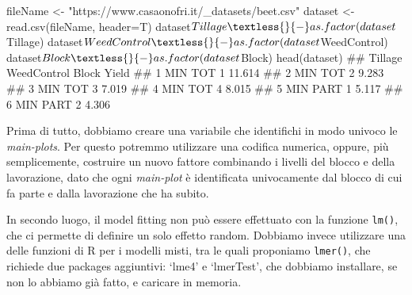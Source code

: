 \documentclass[a4paper,12pt,oneside]{book}
\newenvironment{Shaded}{\begin{snugshade}}{\end{snugshade}}
\newcommand{\SpecialCharTok}[1]{#1}
\newcommand{\StringTok}[1]{#1}
\newcommand{\DocumentationTok}[1]{#1}
\newcommand{\OtherTok}[1]{#1}
\newcommand{\FunctionTok}[1]{#1}
\newcommand{\AttributeTok}[1]{#1}
\newcommand{\NormalTok}[1]{#1}
\begin{document}
\begin{Shaded}
\begin{Highlighting}[]
\NormalTok{fileName }\OtherTok{\textless{}{-}} \StringTok{"https://www.casaonofri.it/\_datasets/beet.csv"}
\NormalTok{dataset }\OtherTok{\textless{}{-}} \FunctionTok{read.csv}\NormalTok{(fileName, }\AttributeTok{header=}\NormalTok{T)}
\NormalTok{dataset}\SpecialCharTok{$}\NormalTok{Tillage }\OtherTok{\textless{}{-}} \FunctionTok{as.factor}\NormalTok{(dataset}\SpecialCharTok{$}\NormalTok{Tillage)}
\NormalTok{dataset}\SpecialCharTok{$}\NormalTok{WeedControl }\OtherTok{\textless{}{-}} \FunctionTok{as.factor}\NormalTok{(dataset}\SpecialCharTok{$}\NormalTok{WeedControl)}
\NormalTok{dataset}\SpecialCharTok{$}\NormalTok{Block }\OtherTok{\textless{}{-}} \FunctionTok{as.factor}\NormalTok{(dataset}\SpecialCharTok{$}\NormalTok{Block)}
\FunctionTok{head}\NormalTok{(dataset)}
\DocumentationTok{\#\#   Tillage WeedControl Block  Yield}
\DocumentationTok{\#\# 1     MIN         TOT     1 11.614}
\DocumentationTok{\#\# 2     MIN         TOT     2  9.283}
\DocumentationTok{\#\# 3     MIN         TOT     3  7.019}
\DocumentationTok{\#\# 4     MIN         TOT     4  8.015}
\DocumentationTok{\#\# 5     MIN        PART     1  5.117}
\DocumentationTok{\#\# 6     MIN        PART     2  4.306}
\end{Highlighting}
\end{Shaded}

Prima di tutto, dobbiamo creare una variabile che identifichi in modo univoco le \emph{main-plots}. Per questo potremmo utilizzare una codifica numerica, oppure, più semplicemente, costruire un nuovo fattore combinando i livelli del blocco e della lavorazione, dato che ogni \emph{main-plot} è identificata univocamente dal blocco di cui fa parte e dalla lavorazione che ha subito.

\begin{Shaded}
\end{Shaded}

In secondo luogo, il model fitting non può essere effettuato con la funzione \texttt{lm()}, che ci permette di definire un solo effetto random. Dobbiamo invece utilizzare una delle funzioni di R per i modelli misti, tra le quali proponiamo \texttt{lmer()}, che richiede due packages aggiuntivi: `lme4' e `lmerTest', che dobbiamo installare, se non lo abbiamo già fatto, e caricare in memoria.
\end{document}
